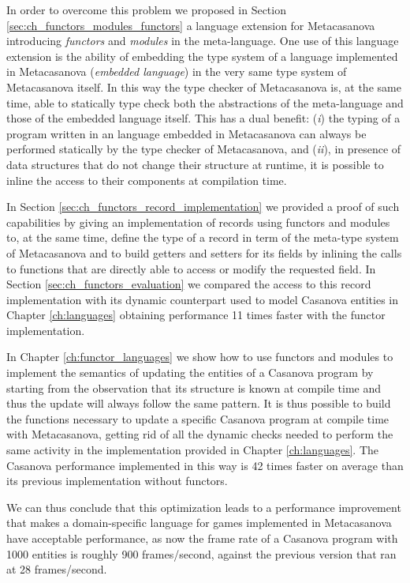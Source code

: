 In order to overcome this problem we proposed in Section \ref{sec:ch_functors_modules_functors} a language extension for Metacasanova introducing \textit{functors} and \textit{modules} in the meta-language. One use of this language extension is the ability of embedding the type system of a language implemented in Metacasanova (\textit{embedded language}) in the very same type system of Metacasanova itself. In this way the type checker of Metacasanova is, at the same time, able to statically type check both the abstractions of the meta-language and those of the embedded language itself. This has a dual benefit: (\textit{i}) the typing of a program written in an language embedded in Metacasanova can always be performed statically by the type checker of Metacasanova, and (\textit{ii}), in presence of data structures that do not change their structure at runtime, it is possible to inline the access to their components at compilation time.

In Section \ref{sec:ch_functors_record_implementation} we provided a proof of such capabilities by giving an implementation of records using functors and modules to, at the same time, define the type of a record in term of the meta-type system of Metacasanova and to build getters and setters for its fields by inlining the calls to functions that are directly able to access or modify the requested field. In Section \ref{sec:ch_functors_evaluation} we compared the access to this record implementation with its dynamic counterpart used to model Casanova entities in Chapter \ref{ch:languages} obtaining performance 11 times faster with the functor implementation.

In Chapter \ref{ch:functor_languages} we show how to use functors and modules to implement the semantics of updating the entities of a Casanova program by starting from the observation that its structure is known at compile time and thus the update will always follow the same pattern. It is thus possible to build the functions necessary to update a specific Casanova program at compile time with Metacasanova, getting rid of all the dynamic checks needed to perform the same activity in the implementation provided in Chapter \ref{ch:languages}. The Casanova performance implemented in this way is 42 times faster on average than its previous implementation without functors.

We can thus conclude that this optimization leads to a performance improvement that makes a domain-specific language for games implemented in Metacasanova have acceptable performance, as now the frame rate of a Casanova program with 1000 entities is roughly 900 frames/second, against the previous version that ran at 28 frames/second.

